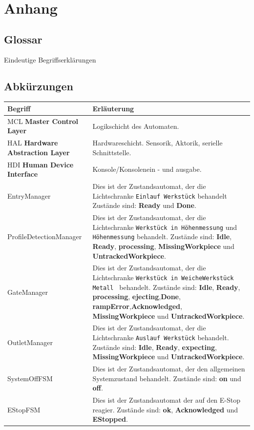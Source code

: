 \documentclass[
   draft=false
  ,paper=a4
  ,twoside=true
  ,fontsize=11pt
  ,headsepline
  ,DIV11
  ,parskip=full+
]{scrartcl} %
\begin{document}
\section{Anhang}
\subsection{Glossar}
Eindeutige Begriffserklärungen


\subsection{Abkürzungen}
\begin{longtable}{|p{} p{} |}
	\hline
	\textbf{Begriff} & \textbf{Erläuterung} \\ [5pt]
	\hline
	\endhead
	\hline 
	\endfoot
	


	MCL 	\textbf{Master Control Layer}&

	Logikschicht des Automaten.
\\ \hline
	HAL 	\textbf{Hardware Abstraction Layer}  & 
	Hardwareschicht. Sensorik, Aktorik, serielle Schnittstelle.
\\ \hline
	HDI  \textbf{Human Device Interface} & Konsole/Konsolenein - und ausgabe.
\\ \hline
	EntryManager &
	Dies ist der Zustandsautomat, der die Lichtschranke \texttt{Einlauf Werkstück} behandelt Zustände sind: \textbf{Ready} und \textbf{Done}.

\\ \hline
	ProfileDetectionManager &
	Dies ist der Zustandsautomat, der die Lichtschranke \texttt{Werkstück in
Höhenmessung} und \texttt{Höhenmessung} behandelt. Zustände sind: \textbf{Idle}, \textbf{Ready}, \textbf{processing}, \textbf{MissingWorkpiece} und  \textbf{UntrackedWorkpiece}. 
\\ \hline
	GateManager &
	Dies ist der Zustandsautomat, der die Lichtschranke \texttt{Werkstück in
Weiche}\texttt{Werkstück Metall } behandelt. Zustände sind: \textbf{Idle}, \textbf{Ready}, \textbf{processing}, \textbf{ejecting},\textbf{Done},  \textbf{rampError},\textbf{Acknowledged},  \textbf{MissingWorkpiece} und  \textbf{UntrackedWorkpiece}. 
\\ \hline
	OutletManager &
	Dies ist der Zustandsautomat, der die Lichtschranke \texttt{Auslauf Werkstück} behandelt. Zustände sind: \textbf{Idle}, \textbf{Ready}, \textbf{expecting}, \textbf{MissingWorkpiece} und  \textbf{UntrackedWorkpiece}. 
\\ \hline
	SystemOffFSM &
	Dies ist der Zustandsautomat, der den allgemeinen Systemzustand behandelt. Zustände sind: \textbf{on} und \textbf{off}.
\\ \hline
EStopFSM &
	Dies ist der Zustandsautomat der auf den E-Stop reagier. Zustände sind: \textbf{ok}, \textbf{Acknowledged} und \textbf{EStopped}.
\\ \hline
\end{longtable}
\end{document}
